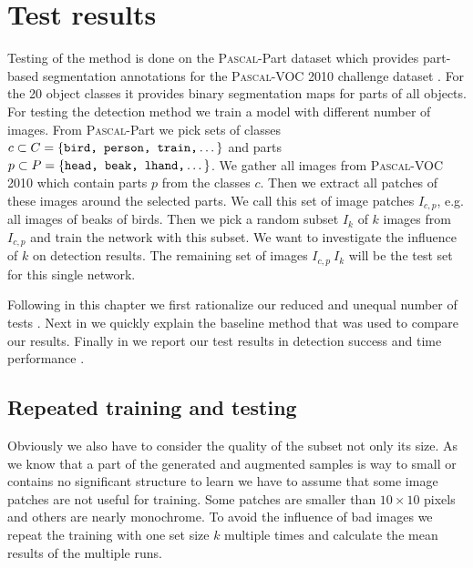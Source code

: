%
\chapter{Test results}
\label{sec:results}
Testing of the method is done on the \textsc{Pascal}-Part dataset \citep{Chen_2014_CVPR} which provides part-based segmentation annotations for the \textsc{Pascal}-VOC 2010 challenge dataset \citep{pascal-voc-2010}. For the 20 object classes it provides binary segmentation maps for parts of all objects.\\
For testing the detection method we train a model with different number of images. From \textsc{Pascal}-Part we pick sets of classes $c \subset C = \{\texttt{bird, person, train,}\dotsc\}$ and parts $p \subset P = \{\texttt{head, beak, lhand,}\dotsc\}$. We gather all images from \textsc{Pascal}-VOC 2010 which contain parts $p$ from the classes $c$. Then we extract all patches of these images around the selected parts. We call this set of image patches $I_{c,p}$, e.g. all images of beaks of birds. Then we pick a random subset $I_k$ of $k$ images from $I_{c,p}$ and train the network with this subset. We want to investigate the influence of $k$ on detection results. The remaining set of images $I_{c,p} \ I_k$ will be the test set for this single network.

Following in this chapter we first rationalize our reduced and unequal number of tests . Next in  we quickly explain the baseline method that was used to compare our results. Finally in  we report our test results in detection success and time performance .

\section{Repeated training and testing}
\label{sec:results:repeat}
Obviously we also have to consider the quality of the subset not only its size. As we know that a part of the generated and augmented samples is way to small or contains no significant structure to learn we have to assume that some image patches are not useful for training. Some patches are smaller than $10\times10$ pixels and others are nearly monochrome. To avoid the influence of bad images we repeat the training with one set size $k$ multiple times and calculate the mean results of the multiple runs.

